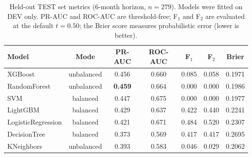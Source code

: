 \begin{table}[ht]
\centering
\caption{Held-out TEST set metrics (6-month horizon, $n=279$). Models were fitted on DEV only. PR-AUC and ROC-AUC are threshold-free; F$_1$ and F$_2$ are evaluated at the default $t=0.50$; the Brier score measures probabilistic error (lower is better).}
\label{tab:step6_test_metrics}
\small
\begin{tabular}{l c c c c c c}
\toprule
Model & Mode & PR-AUC & ROC-AUC & F$_1$ & F$_2$ & Brier \\
\midrule
  XGBoost & unbalanced & 0.456 & 0.660 & 0.085 & 0.058 & 0.1971 \\
  RandomForest & unbalanced & \textbf{0.459} & 0.664 & 0.000 & 0.000 & 0.1986 \\
  SVM & balanced & 0.447 & 0.675 & 0.000 & 0.000 & 0.1977 \\
  LightGBM & balanced & 0.429 & 0.637 & 0.422 & 0.440 & 0.2241 \\
  LogisticRegression & balanced & 0.421 & 0.671 & 0.484 & 0.520 & 0.2307 \\
  DecisionTree & balanced & 0.373 & 0.569 & 0.417 & 0.417 & 0.2695 \\
  KNeighbors & unbalanced & 0.393 & 0.583 & 0.046 & 0.029 & 0.2062 \\
\bottomrule
\end{tabular}
\end{table}
